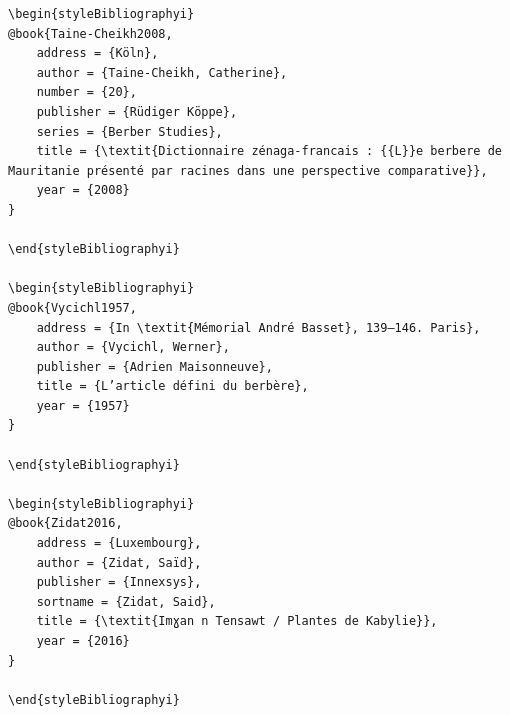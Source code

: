\documentclass[output=paper]{langscibook}
\begin{document}
\begin{verbatim}
\begin{styleBibliographyi}
@book{Taine-Cheikh2008,
	address = {Köln},
	author = {Taine-Cheikh, Catherine},
	number = {20},
	publisher = {Rüdiger Köppe},
	series = {Berber Studies},
	title = {\textit{Dictionnaire zénaga-francais : {{L}}e berbere de Mauritanie présenté par racines dans une perspective comparative}},
	year = {2008}
}

\end{styleBibliographyi}

\begin{styleBibliographyi}
@book{Vycichl1957,
	address = {In \textit{Mémorial André Basset}, 139–146. Paris},
	author = {Vycichl, Werner},
	publisher = {Adrien Maisonneuve},
	title = {L’article défini du berbère},
	year = {1957}
}

\end{styleBibliographyi}

\begin{styleBibliographyi}
@book{Zidat2016,
	address = {Luxembourg},
	author = {Zidat, Saïd},
	publisher = {Innexsys},
	sortname = {Zidat, Said},
	title = {\textit{Imɣan n Tensawt / Plantes de Kabylie}},
	year = {2016}
}

\end{styleBibliographyi}
\end{verbatim}
\sloppy\printbibliography[heading=subbibliography,notkeyword=this]
\end{document}
